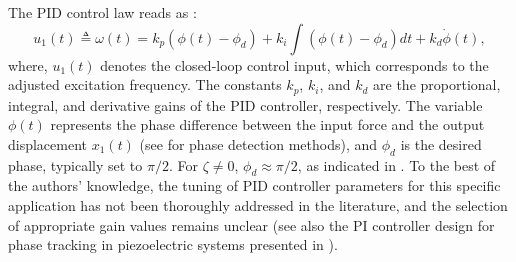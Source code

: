 \documentclass[lettersize,journal]{IEEEtran}
\begin{document}
The PID control law reads as \cite{kuo}:
\begin{equation}
u_1(t)\triangleq\omega(t)=k_p (\phi(t)-\phi_d)+ k_i \int (\phi(t)-\phi_d) dt+k_d \dot{\phi}(t), 
\label{E_frequency_PID}
\end{equation}
where, $u_1(t)$ denotes the closed-loop control input, which corresponds to the adjusted excitation frequency. The constants $k_p$, $k_i$, and $k_d$ are the proportional, integral, and derivative gains of the PID controller, respectively. The variable $\phi(t)$ represents the phase difference between the input force and the output displacement $x_1(t)$ (see  for phase detection methods), and $\phi_d$ is the desired phase, typically set to $\pi/2$. For $\zeta \neq 0$, $\phi_d \approx \pi/2$, as indicated in . To the best of the authors' knowledge, the tuning of PID controller parameters for this specific application has not been thoroughly addressed in the literature, and the selection of appropriate gain values remains unclear (see also the PI controller design for phase tracking in piezoelectric systems presented in \cite{s22176378}).
\end{document}
